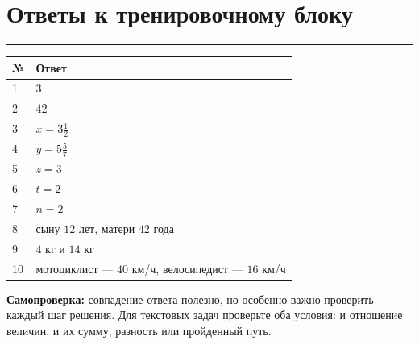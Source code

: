 \documentclass[a4paper,12pt]{article}
\newcommand{\sect}[1]{\section*{#1}\vspace{-3pt}\noindent\textcolor{accent}{\rule{\linewidth}{0.5pt}}\vspace{3pt}}
\begin{document}
\sect{Ответы к тренировочному блоку}
\begin{center}
\renewcommand{\arraystretch}{1.42}
\begin{tabularx}{\linewidth}{@{}p{.10\linewidth}X@{}}
\toprule
\textbf{№} & \textbf{Ответ} \\
\midrule
1 & $3$ \\
2 & $42$ \\
3 & $x=3\frac12$ \\
4 & $y=5\frac57$ \\
5 & $z=3$ \\
6 & $t=2$ \\
7 & $n=2$ \\
8 & сыну $12$ лет, матери $42$ года \\
9 & $4$ кг и $14$ кг \\
10 & мотоциклист --- $40$ км/ч, велосипедист --- $16$ км/ч \\
\bottomrule
\end{tabularx}
\end{center}
\vspace{14mm}
\textcolor{darkaccent}{\textbf{Самопроверка:}} совпадение ответа полезно, но особенно важно проверить каждый шаг решения. Для текстовых задач проверьте оба условия: и отношение величин, и их сумму, разность или пройденный путь.
\end{document}
